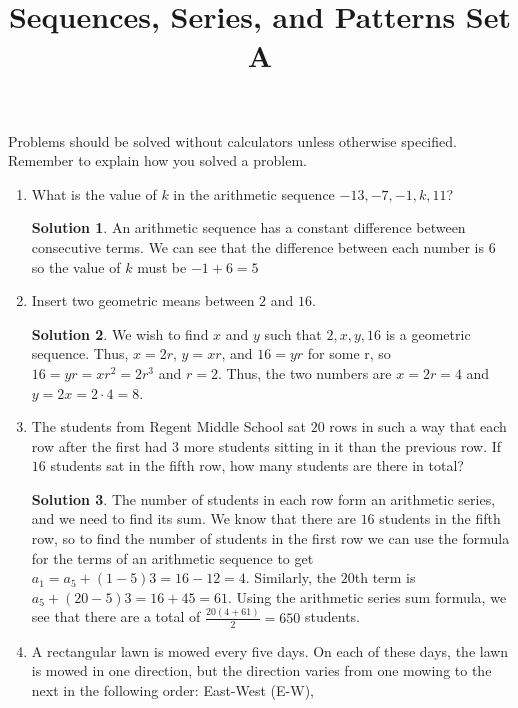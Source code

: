 \documentclass{article}
\title{Sequences, Series, and Patterns Set A}
\date{}
\author{}
\theoremstyle{definition}
\newtheorem*{solution}{Solution}
\begin{document}
    \maketitle
    \noindent Problems should be solved without calculators unless otherwise
    specified. Remember to explain how you solved a problem.
    \begin{enumerate}
        \item What is the value of $k$ in the arithmetic sequence $-13, -7, -1,
        k, 11$?
        \begin{solution}
            An arithmetic sequence has a constant difference between consecutive
            terms. We can see that the difference between each number is $6$ so
            the value of $k$ must be $-1 + 6 = 5$
        \end{solution}
        \item Insert two geometric means between $2$ and $16$.
        \begin{solution}
            We wish to find $x$ and $y$ such that $2, x, y, 16$ is a geometric
            sequence. Thus, $x = 2r$, $y = xr$, and $16 = yr$ for some r, so $16
            = yr = xr^2 = 2r^3$ and $r = 2$. Thus, the two numbers are $x = 2r =
            4$ and $y = 2x = 2 \cdot 4 = 8$.
        \end{solution}
        \item The students from Regent Middle School sat $20$ rows in such a way
        that each row after the first had $3$ more students sitting in it than
        the previous row. If $16$ students sat in the fifth row, how many
        students are there in total?
        \begin{solution}
            The number of students in each row form an arithmetic series, and we
            need to find its sum. We know that there are $16$ students in the
            fifth row, so to find the number of students in the first row we can
            use the formula for the terms of an arithmetic sequence to get $a_1
            = a_5 + (1 - 5)3 = 16 - 12 = 4$. Similarly, the $20$th term is $a_5
            + (20 - 5)3 = 16 + 45 = 61$. Using the arithmetic series sum
            formula, we see that there are a total of $\frac{20(4 + 61)}{2} =
            650$ students.
        \end{solution}
        \item A rectangular lawn is mowed every five days. On each of these
        days, the lawn is mowed in one direction, but the direction varies from
        one mowing to the next in the following order: East-West (E-W),

\end{enumerate}
\end{document}
